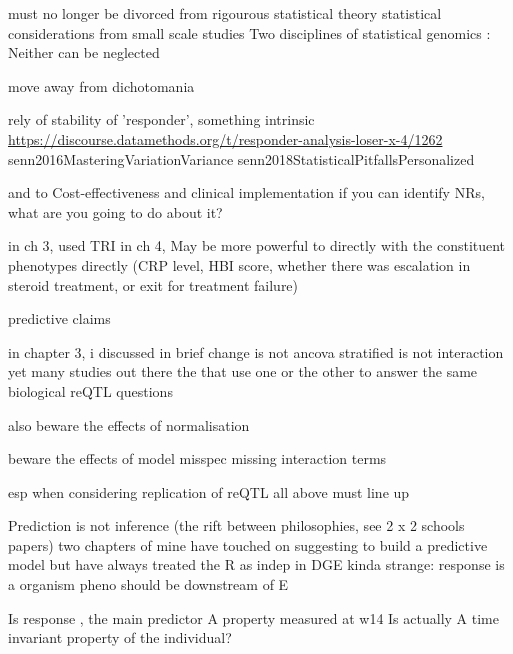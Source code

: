 \begin{outline}
must no longer be divorced from rigourous statistical theory
    statistical considerations from small scale studies
        Two disciplines of statistical genomics : Neither can be neglected

    move away from dichotomania

            rely of stability of 'responder', something intrinsic
                \url{https://discourse.datamethods.org/t/responder-analysis-loser-x-4/1262}
                senn2016MasteringVariationVariance
                senn2018StatisticalPitfallsPersonalized

        and to Cost-effectiveness and clinical implementation
            if you can identify NRs, what are you going to do about it?

        in ch 3, used TRI
        in ch 4, 
            May be more powerful to directly with the constituent phenotypes directly (CRP level, HBI score, whether there was escalation in steroid treatment, or exit for treatment failure)

            predictive claims

    in chapter 3, i discussed in brief
        change is not ancova
        stratified is not interaction
        yet many studies out there the that use one or the other to answer the same biological reQTL questions

    also beware the effects of normalisation

    beware the effects of model misspec
        missing interaction terms

esp when considering replication of reQTL
    all above must line up

Prediction is not inference (the rift between philosophies, see 2 x 2 schools papers)
    two chapters of mine
        have touched on suggesting to build a predictive model
    but have always treated the R as indep in DGE
    kinda strange: response is a organism pheno should be downstream of E

        Is response , the main predictor
        A property measured at w14
        Is actually A time invariant property of the individual?


\end{outline}
